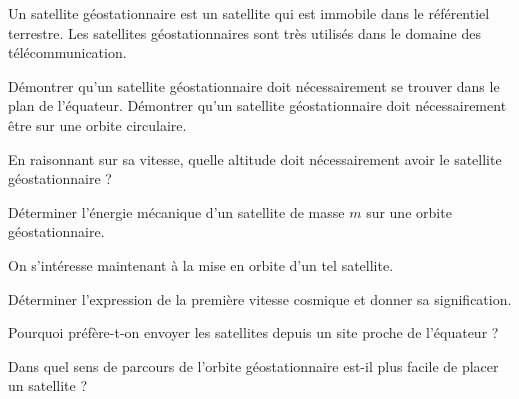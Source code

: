 

Un satellite géostationnaire est un satellite qui est immobile dans le référentiel terrestre. Les satellites géostationnaires sont très utilisés dans le domaine des télécommunication.

\question
\subquestion Démontrer qu'un satellite géostationnaire doit nécessairement se trouver dans le plan de l'équateur.
\subquestion Démontrer qu'un satellite géostationnaire doit nécessairement être sur une orbite circulaire.

\question En raisonnant sur sa vitesse, quelle altitude doit nécessairement avoir le satellite géostationnaire ?

\question Déterminer l'énergie mécanique d'un satellite de masse $m$ sur une orbite géostationnaire.

On s'intéresse maintenant à la mise en orbite d'un tel satellite.

\question Déterminer l'expression de la première vitesse cosmique et donner sa signification.

\question Pourquoi préfère-t-on envoyer les satellites depuis un site proche de l'équateur ?

\question Dans quel sens de parcours de l'orbite géostationnaire est-il plus facile de placer un satellite ?

